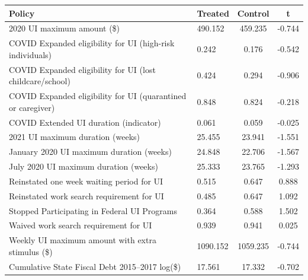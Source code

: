 {
\def\sym#1{\ifmmode^{#1}\else\(^{#1}\)\fi}
\begin{tabular}{l*{1}{lcc}}
\hline\hline
 Policy           &  Treated  &   Control     &   t\\
\hline
2020 UI maximum amount (\$) 
    & 490.152 & 459.235 & -0.744\\

COVID Expanded eligibility for UI (high-risk individuals) 
    & 0.242 & 0.176 & -0.542\\

COVID Expanded eligibility for UI (lost childcare/school) 
    & 0.424 & 0.294 & -0.906\\

COVID Expanded eligibility for UI (quarantined or caregiver) 
    & 0.848 & 0.824 & -0.218\\

COVID Extended UI duration (indicator)
    & 0.061 & 0.059 & -0.025\\

2021 UI maximum duration (weeks) 
    & 25.455 & 23.941 & -1.551\\

January 2020 UI maximum duration (weeks) 
    & 24.848 & 22.706 & -1.567\\

July 2020 UI maximum duration (weeks) 
    & 25.333 & 23.765 & -1.293\\

Reinstated one week waiting period for UI
    & 0.515 & 0.647 & 0.888\\

Reinstated work search requirement for UI
    & 0.485 & 0.647 & 1.092\\

Stopped Participating in Federal UI Programs
    & 0.364 & 0.588 & 1.502\\

Waived work search requirement for UI
    & 0.939 & 0.941 & 0.025\\

Weekly UI maximum amount with extra stimulus (\$)
    & 1090.152 & 1059.235 & -0.744\\

Cumulative State Fiscal Debt 2015--2017 log(\$)
    & 17.561 & 17.332 & -0.702\\ 

\hline\hline
\end{tabular}
}

